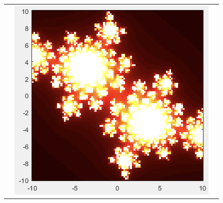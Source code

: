 \documentclass[11pt]{article}
\theoremstyle{plain}
\theoremstyle{definition}
\begin{document}
\begin{tabular}{c c c}
	&\includegraphics*[scale = 0.3]{Plot8.png} 
\end{tabular}
\end{document}

